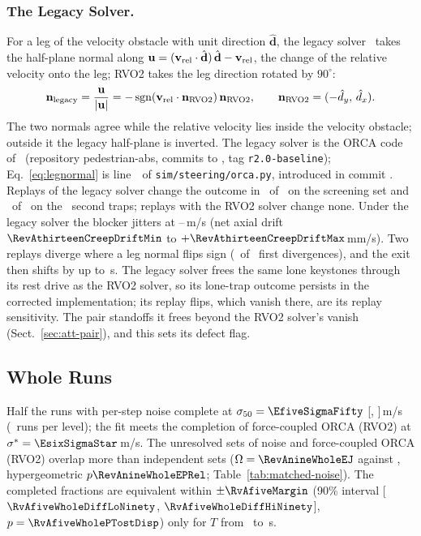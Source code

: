 \subsubsection{The Legacy Solver.}
For a leg of the velocity obstacle with unit direction $\hat{\mathbf d}$, the legacy solver~\cite{gang2026} takes the half-plane normal along $\mathbf u=(\mathbf v_{\rm rel}\cdot\hat{\mathbf d})\,\hat{\mathbf d}-\mathbf v_{\rm rel}$, the change of the relative velocity onto the leg; RVO2 takes the leg direction rotated by $90^\circ$:
\begin{equation}\label{eq:legnormal}
\mathbf n_{\rm legacy}=\frac{\mathbf u}{|\mathbf u|}=-\operatorname{sgn}(\mathbf v_{\rm rel}\cdot\mathbf n_{\rm RVO2})\,\mathbf n_{\rm RVO2},\qquad \mathbf n_{\rm RVO2}=(-\hat d_y,\,\hat d_x).
\end{equation}
The two normals agree while the relative velocity lies inside the velocity obstacle; outside it the legacy half-plane is inverted. The legacy solver is the ORCA code of~\cite{gang2026} (repository pedestrian-abs, commits \texttt{\RevAfourteenCommitConf} to \texttt{\PscrCommitConfHead}, tag \texttt{r2.0-baseline}); Eq.~\eqref{eq:legnormal} is line~\RevAfourteenDefectLine\ of \texttt{sim/steering/orca.py}, introduced in commit \texttt{\RevAfourteenCommitIntro}. Replays of the legacy solver change the outcome in \EtwoReplayCThreePubFlips\ of \EtwoReplayN\ on the screening set and \RevAfiveXPoolLegacyReplayChanged\ of \RevAfiveXPoolLegacyReplays\ on the \RevAfiveXPoolN\ second traps; replays with the RVO2 solver change none. Under the legacy solver the blocker jitters at \PscrCreepSpeedMin--\RevAthirteenCreepSpeedMax\,m/s (net axial drift $\RevAthirteenCreepDriftMin$ to $+\RevAthirteenCreepDriftMax$\,mm/s). Two replays diverge where a leg normal flips sign (\FixAfourDiscLegFlip\ of \FixAfourDiscN\ first divergences), and the exit then shifts by up to \PscrReplayPubMaxDt\,s. The legacy solver frees the same lone keystones through its rest drive as the RVO2 solver, so its lone-trap outcome persists in the corrected implementation; its replay flips, which vanish there, are its replay sensitivity. The pair standoffs it frees beyond the RVO2 solver's vanish (Sect.~\ref{sec:att-pair}), and this sets its defect flag.

\subsection{Whole Runs}\label{sec:att-whole}
Half the runs with per-step noise complete at $\sigma_{50}=\EfiveSigmaFifty$ [\FixAsixSigFiftyClLo, \FixAsixSigFiftyClHi]\,m/s (\EfiveN\ runs per level); the fit meets the completion of force-coupled ORCA (RVO2) at $\sigma^\ast=\EsixSigmaStar$\,m/s. The unresolved sets of noise and force-coupled ORCA (RVO2) overlap more than independent sets ($\Omega=\RevAnineWholeEJ$ against \RevAnineWholeEEJ, hypergeometric $p\RevAnineWholeEPRel$; Table~\ref{tab:matched-noise}).
The completed fractions are equivalent within $\pm\RvAfiveMargin$ (90\% interval [$\RvAfiveWholeDiffLoNinety$, $\RvAfiveWholeDiffHiNinety$], $p=\RvAfiveWholePTostDisp$) only for $T$ from \RvAfiveWholeWinFrom\ to \RvAfiveWholeWinTo\,s.

